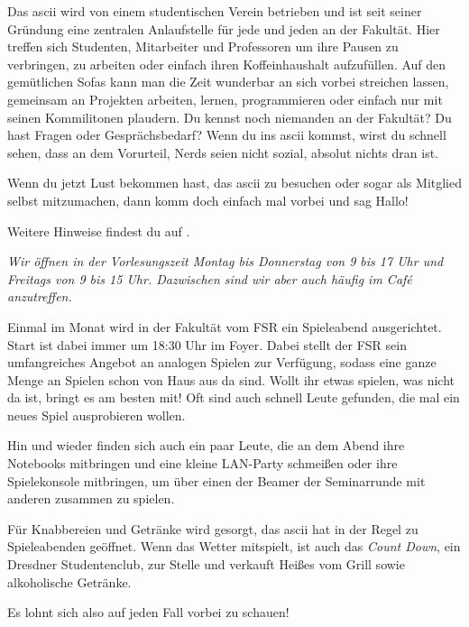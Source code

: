 Das ascii wird von einem studentischen Verein betrieben und ist seit seiner Gründung eine zentralen Anlaufstelle für jede und jeden an der Fakultät.
Hier treffen sich Studenten, Mitarbeiter und Professoren um ihre Pausen zu verbringen,
zu arbeiten oder einfach ihren Koffeinhaushalt aufzufüllen.
Auf den gemütlichen Sofas kann man die Zeit wunderbar an sich vorbei streichen lassen,
gemeinsam an Projekten arbeiten, lernen, programmieren oder einfach nur mit seinen Kommilitonen plaudern.
Du kennst noch niemanden an der Fakultät?
Du hast Fragen oder Gesprächsbedarf?
Wenn du ins ascii kommst, wirst du schnell sehen, dass an dem Vorurteil, Nerds seien nicht sozial, absolut nichts dran ist.

Wenn du jetzt Lust bekommen hast, das ascii zu besuchen oder sogar als Mitglied selbst mitzumachen, dann komm doch einfach mal vorbei und sag Hallo!

Weitere Hinweise findest du auf .

\textit{Wir öffnen in der Vorlesungszeit Montag bis Donnerstag von 9 bis 17 Uhr und Freitags von 9 bis 15 Uhr. Dazwischen sind wir aber auch häufig im Café anzutreffen.}

\pagebreak


Einmal im Monat wird in der Fakultät vom FSR ein Spieleabend ausgerichtet. Start ist dabei immer um 18:30 Uhr im Foyer. Dabei stellt der FSR sein umfangreiches Angebot an analogen Spielen zur Verfügung, sodass eine ganze Menge an Spielen schon von Haus aus da sind. Wollt ihr etwas spielen, was nicht da ist, bringt es am besten mit! Oft sind auch schnell Leute gefunden, die mal ein neues Spiel ausprobieren wollen.

Hin und wieder finden sich auch ein paar Leute, die an dem Abend ihre Notebooks mitbringen und eine kleine LAN-Party schmeißen oder ihre Spielekonsole mitbringen, um über einen der Beamer der Seminarrunde mit anderen zusammen zu spielen.

Für Knabbereien und Getränke wird gesorgt, das ascii hat in der Regel zu Spieleabenden geöffnet. Wenn das Wetter mitspielt, ist auch das \emph{Count Down}, ein Dresdner Studentenclub, zur Stelle und verkauft Heißes vom Grill sowie alkoholische Getränke.

Es lohnt sich also auf jeden Fall vorbei zu schauen!


\pagebreak 

\
\thispagestyle{empty}

